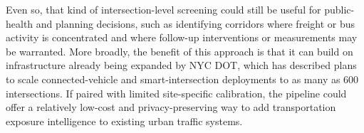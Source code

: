 Even so, that kind of intersection-level 
screening could still be useful for public-health and planning decisions, such as
identifying corridors where freight or bus activity is concentrated and where 
follow-up interventions or measurements may be warranted. More broadly, the benefit
of this approach is that it can build on infrastructure already being expanded by 
NYC DOT, which has described plans to scale connected-vehicle and smart-intersection
deployments to as many as 600 intersections. If paired with limited 
site-specific calibration, the pipeline could offer a relatively low-cost and 
privacy-preserving way to add transportation exposure intelligence to existing 
urban traffic systems.


